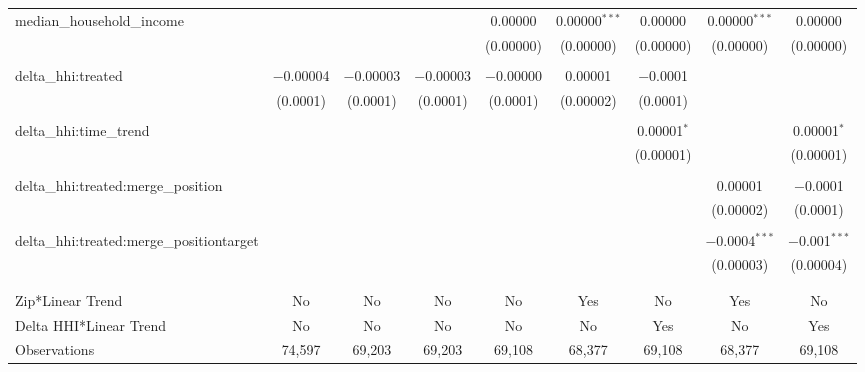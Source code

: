 \begin{table}[H]
{\begin{tabular}{@{\extracolsep{5pt}}lcccccccc}
  median\_household\_income &  &  &  & 0.00000 & 0.00000$^{***}$ & 0.00000 & 0.00000$^{***}$ & 0.00000 \\  

   &  &  &  & (0.00000) & (0.00000) & (0.00000) & (0.00000) & (0.00000) \\  

   & & & & & & & & \\  

  delta\_hhi:treated & $-$0.00004 & $-$0.00003 & $-$0.00003 & $-$0.00000 & 0.00001 & $-$0.0001 &  &  \\  

   & (0.0001) & (0.0001) & (0.0001) & (0.0001) & (0.00002) & (0.0001) &  &  \\  

   & & & & & & & & \\  

  delta\_hhi:time\_trend &  &  &  &  &  & 0.00001$^{*}$ &  & 0.00001$^{*}$ \\  

   &  &  &  &  &  & (0.00001) &  & (0.00001) \\  

   & & & & & & & & \\  

  delta\_hhi:treated:merge\_position &  &  &  &  &  &  & 0.00001 & $-$0.0001 \\  

   &  &  &  &  &  &  & (0.00002) & (0.0001) \\  

   & & & & & & & & \\  

  delta\_hhi:treated:merge\_positiontarget &  &  &  &  &  &  & $-$0.0004$^{***}$ & $-$0.001$^{***}$ \\  

   &  &  &  &  &  &  & (0.00003) & (0.00004) \\  

   & & & & & & & & \\  

 \hline \\[-1.8ex]  

 Zip*Linear Trend & No & No & No & No & Yes & No & Yes & No \\  

 Delta HHI*Linear Trend & No & No & No & No & No & Yes & No & Yes \\  

 Observations & 74,597 & 69,203 & 69,203 & 69,108 & 68,377 & 69,108 & 68,377 & 69,108 \\  


\end{tabular}}
\end{table}
